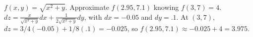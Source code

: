 {$f(x,y) = \sqrt{x^2+y}$. Approximate $f(2.95,7.1)$ knowing $f(3,7) = 4$. 
}
{$dz = \frac{x}{\sqrt{x^2+y}}dx + \frac{1}{2\sqrt{x^2+y}}dy$, with $dx = -0.05$ and $dy = .1$. At $(3,7)$, $dz = 3/4(-0.05) + 1/8(.1) = -0.025$, so $f(2.95,7.1) \approx -0.025+4 = 3.975$.
}